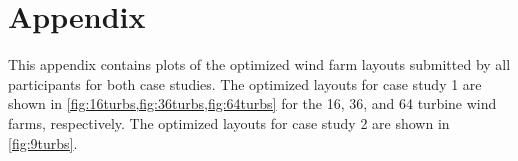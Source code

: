 \documentclass[conf,hidelinks]{new-aiaa} %
\begin{document}
\newpage
\section*{Appendix}
This appendix contains plots of the optimized wind farm layouts submitted by all participants for both case studies. The optimized layouts for case study 1 are shown in \cref{fig:16turbs,fig:36turbs,fig:64turbs} for the 16, 36, and 64 turbine wind farms, respectively. The optimized layouts for case study 2 are shown in \cref{fig:9turbs}.

\begin{figure}[htbp!]
	\centering
\end{figure}
\end{document}
